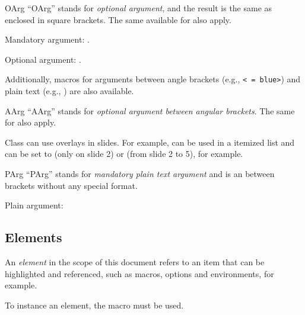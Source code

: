 \documentclass[11pt, outdir = ./out]{article}
\begin{document}
\begin{Macrodef}{OArg}{}{}
    ``OArg'' stands for \textit{optional argument}, and the result is the same as  enclosed in square brackets. The same  available for  also apply.
\end{Macrodef}

\begin{DocsExample}
    Mandatory argument: .\par
    Optional argument: .
\end{DocsExample}

Additionally, macros for arguments between angle brackets (e.g., \texttt{< = blue>}) and plain text (e.g., ) are also available.

\begin{Macrodef}{AArg}{}{}
    ``AArg'' stands for \textit{optional argument between angular brackets}. The same  for  also apply.
\end{Macrodef}

\begin{DocsExample}
    Class  can use overlays in slides. For example,  can be used in a itemized list and  can be set to  (only on slide 2) or  (from slide 2 to 5), for example.
\end{DocsExample}

\begin{Macrodef}{PArg}{}{}
    ``PArg'' stands for \textit{mandatory plain text argument} and is an  between brackets without any special format.
\end{Macrodef}

\begin{DocsExample}
    Plain argument: 
\end{DocsExample}

\subsection{Elements}

An \textit{element} in the scope of this document refers to an item that can be highlighted and referenced, such as macros, options and environments, for example.

To instance an element, the  macro must be used.
\end{document}
